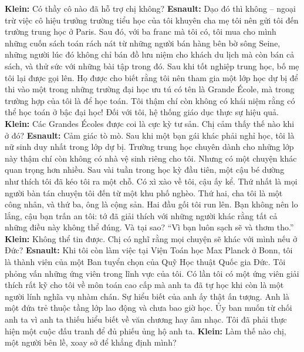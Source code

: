 \begin{multicols}{2}
	\vskip 0.1cm
	\textbf{\color{doithoaitoanhoc}Klein:} Có thầy cô nào đã hỗ trợ chị không?
	\vskip 0.1cm
	\textbf{\color{doithoaitoanhoc}Esnault:} Dạo đó thì không -- ngoại trừ việc cô hiệu trưởng trường tiểu học của tôi khuyên cha mẹ tôi nên gửi tôi đến trường trung học ở Paris. Sau đó, với ba franc mà tôi có, tôi mua cho mình những cuốn sách toán rách nát từ những người bán hàng bên bờ sông Seine, những người lúc đó không chỉ bán đồ lưu niệm cho khách du lịch mà còn bán cả sách, và thử sức với những bài tập trong đó. Sau khi tốt nghiệp trung học, bố mẹ tôi lại được gọi lên. Họ được cho biết rằng tôi nên tham gia một lớp học dự bị để thi vào một trong những trường đại học ưu tú có tên là Grande École, mà trong trường hợp của tôi là để học toán. Tôi thậm chí còn không có khái niệm rằng có thể học toán ở bậc đại học! Đối với tôi, hệ thống giáo dục thực sự hiệu quả.
	\vskip 0.1cm
	\textbf{\color{doithoaitoanhoc}Klein:} Các Grandes Écoles được coi là cực kỳ tư sản. Chị cảm thấy thế nào khi ở đó?
	\vskip 0.1cm
	\textbf{\color{doithoaitoanhoc}Esnault:} Cảm giác tò mò. Sau khi một bạn gái khác phải nghỉ học, tôi là nữ sinh duy nhất trong lớp dự bị. Trường trung học chuyên dành cho những lớp này thậm chí còn không có nhà vệ sinh riêng cho tôi. Nhưng có một chuyện khác quan trọng hơn nhiều. Sau vài tuần trong học kỳ đầu tiên, một cậu bé dường như thích tôi đã kéo tôi ra một chỗ. Có xì xào về tôi, cậu ấy kể. Thứ nhất là mọi người bàn tán chuyện tôi đến từ một khu phố nghèo. Thứ hai, cha tôi là một công nhân, và thứ ba, ông là cộng sản. Hai đầu gối tôi run lên. Bạn không nên lo lắng, cậu bạn trấn an tôi: tớ đã giải thích với những người khác rằng tất cả những điều này không thể đúng. Và tại sao? “Vì bạn luôn sạch sẽ và thơm tho.”
	\vskip 0.1cm
	\textbf{\color{doithoaitoanhoc}Klein:} Không thể tin được. Chị có nghĩ rằng mọi chuyện sẽ khác với mình nếu ở Đức?
	\vskip 0.1cm
	\textbf{\color{doithoaitoanhoc}Esnault:} Khi tôi còn làm việc tại Viện Toán học Max Planck ở Bonn, tôi là thành viên của một Ban tuyển chọn của Quỹ Học thuật Quốc gia Đức. Tôi phỏng vấn những ứng viên trong lĩnh vực của tôi. Có lần tôi có một ứng viên giải thích rất kỹ cho tôi về môn toán cao cấp mà anh ta đã tự học khi còn là một người lính nghĩa vụ nhàm chán. Sự hiểu biết của anh ấy thật ấn tượng. Anh là một đứa trẻ thuộc tầng lớp lao động và chưa bao giờ học. Ủy ban muốn từ chối anh ta vì anh ta thiếu hiểu biết về văn chương hay âm nhạc. Tôi đã phải thực hiện một cuộc đấu tranh để đủ phiếu ủng hộ anh ta. 
	\vskip 0.1cm
	\textbf{\color{doithoaitoanhoc}Klein:} Làm thế nào chị, một người bên lề, xoay sở để khẳng định mình?

\end{multicols}
